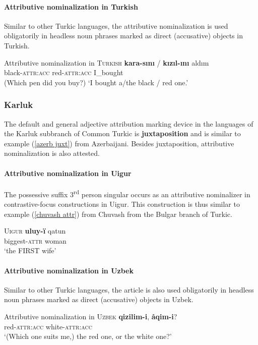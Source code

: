 \paragraph{Attributive nominalization in Turkish}\label{turkish synchr}
Similar to other Turkic languages, the attributive nominalization is used obligatorily in headless noun phrases marked as direct (accusative) objects in Turkish.
\begin{exe}
\ex Attributive nominalization in \textsc{Turkish} \citep[7]{benzing1993b} \label{turkish headless acc}	
\gll	\textbf{kara-sını} / \textbf{kızıl-ını} aldım\\
 	black-\textsc{attr:acc} { } red-\textsc{attr:acc} I\_bought\\
\glt 	(Which pen did you buy?) ‘I bought a/the black / red one.’
\end{exe}
 
\subsubsection{Karluk}
The default and general adjective attribution marking device in the languages of the Karluk subbranch of Common Turkic is \textbf{juxtaposition} and is similar to example (\ref{azerb juxt}) from Azerbaijani. Besides juxtaposition, attributive nominalization is also attested.

\paragraph{Attributive nominalization in Uigur} 
The possessive suffix 3\textsuperscript{rd} person singular occurs as an attributive nominalizer in contrastive-focus constructions in Uigur. This construction is thus similar to example (\ref{chuvash attr}) from Chuvash from the Bulgar branch of Turkic.
\begin{exe}
\ex \textsc{Uigur} \citep[17–18, Footnote 58]{benzing1993b}
\gll	\textbf{uluy-ï} qatun\\
	biggest-\textsc{attr} woman\\
\glt	‘the FIRST wife’
\end{exe}

\paragraph{Attributive nominalization in Uzbek}
Similar to other Turkic languages, the article is also used obligatorily in headless noun phrases marked as direct (accusative) objects in Uzbek. 
\begin{exe}
\ex Attributive nominalization in \textsc{Uzbek} \citep[371]{boeschoten1998} \label{uzbek headless acc}	
 \textbf{qizilim-i}, \textbf{åqim-i}?\\
 	{ } red-\textsc{attr:acc} white-\textsc{attr:acc}\\
\glt 	‘(Which one suits me,) the red one, or the white one?’
\end{exe}

